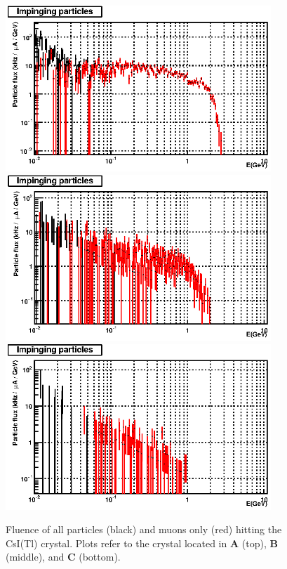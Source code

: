 \begin{figure}[h!] 
\center
\includegraphics[width=10.0cm]{figs/fig19_crsA.eps}
\includegraphics[width=10.0cm]{figs/fig19_crsB.eps}
\includegraphics[width=10.0cm]{figs/fig19_crsC.eps}
\caption {Fluence  of all particles (black) and muons only (red) hitting the CsI(Tl) crystal.
Plots refer to the crystal located in {\bf A} (top),  {\bf B} (middle), and {\bf C} (bottom).}
\label{fig:fluence-mAs}
\end{figure}

